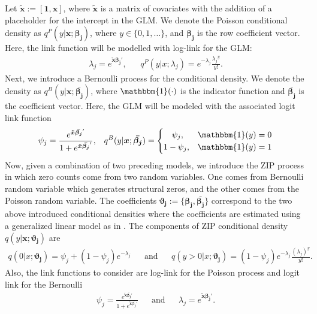 \documentclass[11pt,letterpaper]{article}
\numberwithin{equation}{section}
\numberwithin{equation}{section}
\numberwithin{equation}{section}
\begin{document}
\newcommand{\xTilda}{\bm{\tilde{x}}}
Let $ \xTilda := [\bm{1},\bm{x}]$, where $\xTilda $ is a matrix of covariates with the addition of a placeholder for the intercept in the GLM. We denote the Poisson conditional density  as $ q^P(y|\bm{x}; \bm{\beta_j}) $, where $y \in \{0,1,\dots\}$, and  $\bm{\beta_j}$ is the row coefficient vector. 
Here, the link function will be modelled with log-link for the GLM:
 \begin{align*}
\lambda_j = e^{\xTilda \bm{\beta_j}'}, && %
q^P(y|  x ; \lambda_{j} ) = e^{-\lambda_j} \frac{{\lambda_j}^y}{y!}.
 \end{align*}
Next, we introduce a Bernoulli process for the conditional density. We denote the density as  $ q^{B}(y|\bm{x}; \bm{\bar{\beta_j}}) $, where $\mathbbm{1}(\cdot)$ is the indicator function and  $\bm{\bar{\beta_j}}$ is the coefficient vector.  Here, the GLM will be modeled with the associated logit link function
 \begin{align*}
 \psi_j =  \frac{e^{\xTilda \bm{\bar{\beta_j}}'}}{1+ e^{\xTilda  \bm{\bar{\beta_j}}'}},  &&
 q^B(y | \bm{x} ; \bm{\bar{\beta_j}}) = \begin{cases} 
      \quad \psi_j, & \mathbbm{1}(y) = 0 \\
     1 -  \psi_j,  & \mathbbm{1}(y) = 1
   \end{cases}
 \end{align*}
 Now, given a combination of two preceding models, we introduce the ZIP process in which zero counts come from two random variables. One comes from Bernoulli random variable which generates structural zeros, and the other comes from the Poisson random variable. The coefficients $ \bm{\vartheta_{j}} :=  \{ \bm{\beta_{j}},  \bm{\bar{\beta_j}} \} $ correspond to the two above introduced conditional densities where the coefficients are estimated using a generalized linear model as in \cite{Lambert}. The components of ZIP conditional density $q(y|\bm{x}; \bm{\vartheta_{j}}  )$ are %
 \begin{align*}
 q(0 | x ; \bm{ \vartheta_{j} } ) = \psi_j + (1 - \psi_j)e^{-\lambda_j}  & &  \text{and}  & &
q(y > 0 |  x ; \bm{ \vartheta_{j} } ) = (1 - \psi_j)e^{-\lambda_j} \frac{\left(\lambda_j \right)^y  }{y!}.  
 \end{align*}
Also, the link functions to consider are log-link for the Poisson process and logit link for the Bernoulli
 \begin{align*}
 \psi_j =  \frac{e^{\xTilda \bm{\bar{\beta_j}}'}}{1+ e^{\xTilda \bm{\bar{\beta_j}}'}}  & & \text{and} & &
\lambda_j  = e^{\xTilda \bm{\beta_j}'}.
 \end{align*}
\end{document}
